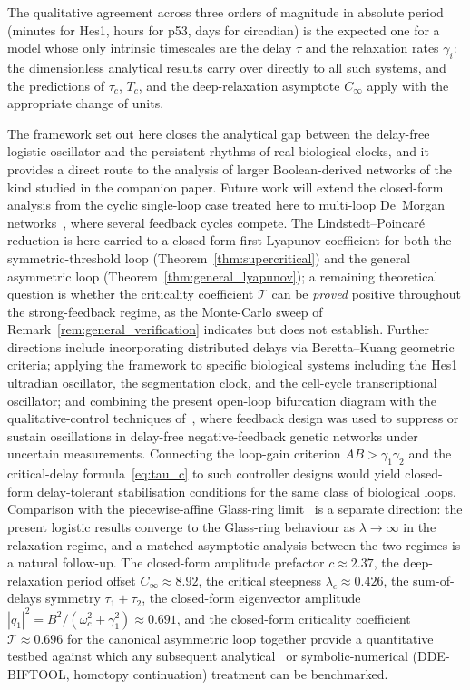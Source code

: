\documentclass[sn-mathphys,Numbered]{sn-jnl}
\theoremstyle{thmstyleone}
\theoremstyle{thmstyletwo}
\theoremstyle{thmstylethree}
\begin{document}
The qualitative agreement across three orders of magnitude in absolute
period (minutes for Hes1, hours for p53, days for circadian) is the
expected one for a model whose only intrinsic timescales are the
delay $\tau$ and the relaxation rates $\gamma_i$: the dimensionless
analytical results carry over directly to all such systems, and the
predictions of $\tau_c$, $T_c$, and the deep-relaxation asymptote
$C_\infty$ apply with the appropriate change of units.

The framework set out here closes the analytical gap between the
delay-free logistic oscillator and the persistent rhythms of real
biological clocks, and it provides a direct route to the analysis of
larger Boolean-derived networks of the kind studied in the companion
paper. Future work will extend the closed-form analysis from the cyclic
single-loop case treated here to multi-loop De~Morgan
networks~\cite{belgacem2026logistic}, where several feedback cycles
compete. The Lindstedt--Poincar\'e
reduction is here carried to a closed-form first Lyapunov coefficient
for both the symmetric-threshold loop
(Theorem~\ref{thm:supercritical}) and the general asymmetric loop
(Theorem~\ref{thm:general_lyapunov}); a remaining theoretical question
is whether the criticality coefficient $\mathcal{T}$ can be \emph{proved}
positive throughout the strong-feedback regime, as the Monte-Carlo
sweep of Remark~\ref{rem:general_verification} indicates but does not
establish. Further directions include incorporating distributed delays
via Beretta--Kuang geometric criteria; applying the framework to
specific biological systems including the Hes1 ultradian oscillator,
the segmentation clock, and the cell-cycle transcriptional oscillator;
and combining the present open-loop bifurcation diagram with the
qualitative-control techniques of~\cite{belgacem2021control,chambon2020qualitative},
where feedback design was used to suppress or sustain oscillations in
delay-free negative-feedback genetic networks under uncertain
measurements. Connecting the loop-gain criterion $AB>\gamma_1\gamma_2$
and the critical-delay formula~\eqref{eq:tau_c} to such controller
designs would yield closed-form delay-tolerant stabilisation
conditions for the same class of biological loops. Comparison with the
piecewise-affine Glass-ring
limit~\cite{belgacem2025computer,farcot2019chaos} is a separate
direction: the present logistic results converge to the Glass-ring
behaviour as $\lambda\to\infty$ in the relaxation regime, and a
matched asymptotic analysis between the two regimes is a natural
follow-up. The closed-form amplitude prefactor $c\approx 2.37$, the
deep-relaxation period offset $C_\infty\approx 8.92$, the critical
steepness $\lambda_c\approx 0.426$, the sum-of-delays symmetry
$\tau_1+\tau_2$, the closed-form eigenvector amplitude
$|q_1|^{2}=B^{2}/(\omega_c^{2}+\gamma_1^{2})\approx 0.691$, and the
closed-form criticality coefficient $\mathcal{T}\approx0.696$ for the canonical
asymmetric loop together provide a quantitative testbed against which
any subsequent analytical~\cite{hassard1981theory} or
symbolic-numerical (DDE-BIFTOOL, homotopy continuation) treatment can
be benchmarked.
\end{document}
